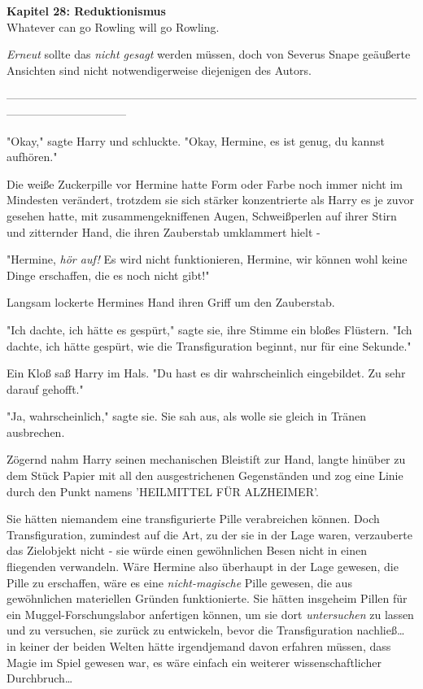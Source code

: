 

\hypertarget{reduktionismus}{%

\textbf{Kapitel 28: Reduktionismus}\\

Whatever can go Rowling will go Rowling.

\emph{Erneut} sollte das \emph{nicht gesagt} werden müssen, doch von Severus Snape geäußerte Ansichten sind nicht notwendigerweise diejenigen des Autors.

--------------------------------------------------------------------------------------------------------------------------------------------

"Okay," sagte Harry und schluckte. "Okay, Hermine, es ist genug, du kannst aufhören."

Die weiße Zuckerpille vor Hermine hatte Form oder Farbe noch immer nicht im Mindesten verändert, trotzdem sie sich stärker konzentrierte als Harry es je zuvor gesehen hatte, mit zusammengekniffenen Augen, Schweißperlen auf ihrer Stirn und zitternder Hand, die ihren Zauberstab umklammert hielt -

"Hermine, \emph{hör auf!} Es wird nicht funktionieren, Hermine, wir können wohl keine Dinge erschaffen, die es noch nicht gibt!"

Langsam lockerte Hermines Hand ihren Griff um den Zauberstab.

"Ich dachte, ich hätte es gespürt," sagte sie, ihre Stimme ein bloßes Flüstern. "Ich dachte, ich hätte gespürt, wie die Transfiguration beginnt, nur für eine Sekunde."

Ein Kloß saß Harry im Hals. "Du hast es dir wahrscheinlich eingebildet. Zu sehr darauf gehofft."

"Ja, wahrscheinlich," sagte sie. Sie sah aus, als wolle sie gleich in Tränen ausbrechen.

Zögernd nahm Harry seinen mechanischen Bleistift zur Hand, langte hinüber zu dem Stück Papier mit all den ausgestrichenen Gegenständen und zog eine Linie durch den Punkt namens 'HEILMITTEL FÜR ALZHEIMER'.

Sie hätten niemandem eine transfigurierte Pille verabreichen können. Doch Transfiguration, zumindest auf die Art, zu der sie in der Lage waren, verzauberte das Zielobjekt nicht - sie würde einen gewöhnlichen Besen nicht in einen fliegenden verwandeln. Wäre Hermine also überhaupt in der Lage gewesen, die Pille zu erschaffen, wäre es eine \emph{nicht-magische} Pille gewesen, die aus gewöhnlichen materiellen Gründen funktionierte. Sie hätten insgeheim Pillen für ein Muggel-Forschungslabor anfertigen können, um sie dort \emph{untersuchen} zu lassen und zu versuchen, sie zurück zu entwickeln, bevor die Transfiguration nachließ… in keiner der beiden Welten hätte irgendjemand davon erfahren müssen, dass Magie im Spiel gewesen war, es wäre einfach ein weiterer wissenschaftlicher Durchbruch…

}
